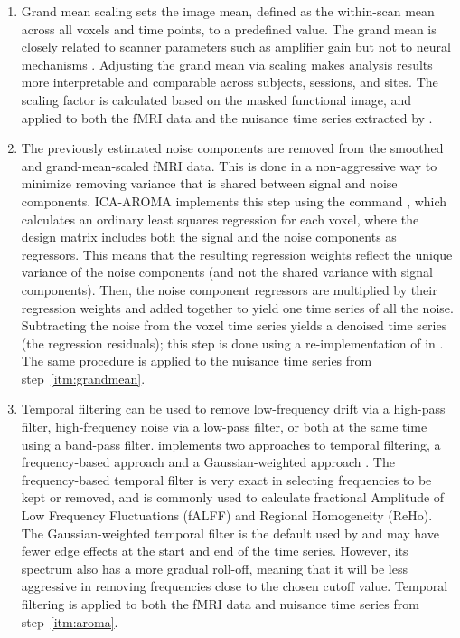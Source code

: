\begin{enumerate}[leftmargin=*]
\item\label{itm:grandmean}

Grand mean scaling sets the image mean, defined as the within-scan mean
across all voxels and time points, to a predefined value. The grand mean is
closely related to scanner parameters such as amplifier gain but not to
neural mechanisms \parencite{10.1006/nimg.2002.1226}. Adjusting the grand mean
via scaling makes analysis results more interpretable and comparable across
subjects, sessions, and sites. The scaling factor is calculated based on
the masked functional image, and applied to both the fMRI data and the
nuisance time series extracted by .

\item\label{itm:aroma}

The previously estimated  noise components are removed from
the smoothed and grand-mean-scaled fMRI data. This is done in a
non-aggressive way to minimize removing variance that is shared between
signal and noise components. ICA-AROMA implements this step using the 
command , which calculates an ordinary least squares
regression for each voxel, where the design matrix includes both the signal
and the noise components as regressors. This means that the resulting
regression weights reflect the unique variance of the noise components (and
not the shared variance with signal components). Then, the noise component
regressors are multiplied by their regression weights and added together to
yield one time series of all the noise. Subtracting the noise from the
voxel time series yields a denoised time series (the regression residuals);
this step is done using a re-implementation of  in
 \parencite{10.1038/s41586-020-2649-2}. The same procedure is
applied to the nuisance time series from step~\ref{itm:grandmean}.

\item\label{itm:tempfilt}

Temporal filtering can be used to remove low-frequency drift via a
high-pass filter, high-frequency noise via a low-pass filter, or both at
the same time using a band-pass filter.  implements two
approaches to temporal filtering, a frequency-based approach
\parencite{10.1155/2013/935154} and a Gaussian-weighted approach
\parencite{10.1006/nimg.2000.0628}. The frequency-based temporal filter is very
exact in selecting frequencies to be kept or removed, and is commonly used
to calculate fractional Amplitude of Low Frequency Fluctuations (fALFF) and
Regional Homogeneity (ReHo). The Gaussian-weighted temporal filter is the
default used by  \parencite{10.1016/j.neuroimage.2011.09.015}
and may have fewer edge effects at the start and end of the time series.
However, its spectrum also has a more gradual roll-off, meaning that it
will be less aggressive in removing frequencies close to the chosen cutoff
value. Temporal filtering is applied to both the fMRI data and nuisance
time series from step~\ref{itm:aroma}.


\end{enumerate}
